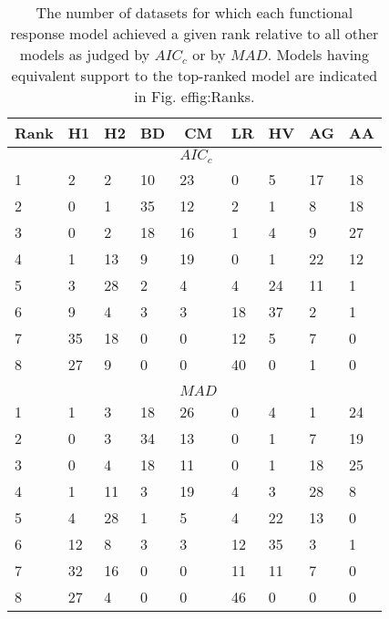\begin{table}[!tbp]
\caption{The number of datasets for which each functional response model achieved a given rank relative to all other models as judged by $AIC_c$ or by $MAD$.  Models having equivalent support to the top-ranked model are indicated in Fig. 
ef{fig:Ranks}.\label{table:AICc_and_MAD_rankings}} 
\begin{center}
\begin{tabular}{lllllllll}
\hline\hline
\multicolumn{1}{l}{Rank}&\multicolumn{1}{c}{H1}&\multicolumn{1}{c}{H2}&\multicolumn{1}{c}{BD}&\multicolumn{1}{c}{CM}&\multicolumn{1}{c}{LR}&\multicolumn{1}{c}{HV}&\multicolumn{1}{c}{AG}&\multicolumn{1}{c}{AA}\tabularnewline
\hline
&&&&$AIC_c$&&&&\tabularnewline
1&2&2&10&23&0&5&17&18\tabularnewline
2&0&1&35&12&2&1&8&18\tabularnewline
3&0&2&18&16&1&4&9&27\tabularnewline
4&1&13&9&19&0&1&22&12\tabularnewline
5&3&28&2&4&4&24&11&1\tabularnewline
6&9&4&3&3&18&37&2&1\tabularnewline
7&35&18&0&0&12&5&7&0\tabularnewline
8&27&9&0&0&40&0&1&0\tabularnewline
&&&&&&&&\tabularnewline
&&&&$MAD$&&&&\tabularnewline
1&1&3&18&26&0&4&1&24\tabularnewline
2&0&3&34&13&0&1&7&19\tabularnewline
3&0&4&18&11&0&1&18&25\tabularnewline
4&1&11&3&19&4&3&28&8\tabularnewline
5&4&28&1&5&4&22&13&0\tabularnewline
6&12&8&3&3&12&35&3&1\tabularnewline
7&32&16&0&0&11&11&7&0\tabularnewline
8&27&4&0&0&46&0&0&0\tabularnewline
\hline
\end{tabular}\end{center}
\end{table}
